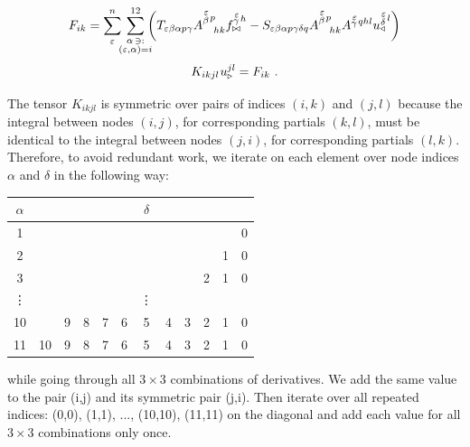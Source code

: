    \begin{equation}
      F_{ik} =
      \sum^n_\varepsilon
      \mkern-7mu
      \sum_{\substack{\alpha \, \ni: \\ (\varepsilon,\alpha) = i}}^{12}
      \mkern-10mu
      \qty(
      T_{\varepsilon \beta \alpha p \gamma}
      A^{\substack{\mkern2mu \varepsilon \\[0.15mm] \beta} \mkern2mu p}_{\mkern19mu hk}    f^{\substack{\mkern2mu \varepsilon \\[-0.4mm] \gamma} \mkern2mu h}_{\bowtie}
      -
      S_{\varepsilon \beta \alpha p \gamma \delta q}    A^{\substack{\mkern2mu \varepsilon \\[0.15mm] \beta} \mkern2mu p}_{\mkern19mu hk}    A^{\substack{\mkern2mu \varepsilon \\[-0.4mm] \gamma} \mkern2mu qhl}    u^{\substack{\mkern2mu \varepsilon \\[0.2mm] \delta} \mkern2mu l}_\triangleleft )
   \end{equation}
   \begin{equation*}
      K_{i k j l} \mkern1mu u^{j l}_\triangleright
      =
      F_{i k} \ .
   \end{equation*}

   The tensor $K_{ikjl}$ is symmetric over pairs of indices $(i,k)$ and $(j,l)$ because the integral between nodes $(i,j)$, for corresponding partials $(k,l)$, must be identical to the integral between nodes $(j,i)$, for corresponding partials $(l,k)$. Therefore, to avoid redundant work, we iterate on each element over node indices $\alpha$ and $\delta$ in the following way:

   \begin{longtable}{c|ccccccccccc}
      $\alpha$ & \hspace{6mm} & \hspace{6mm} & \hspace{6mm} & \hspace{6mm} & \hspace{6mm} & \hspace{1.3mm} $\delta$ \hspace{1.3mm} & \hspace{6mm} & \hspace{6mm} & \hspace{6mm} & \hspace{6mm} & \hspace{6mm} \\
      \hline
      1  &    &   &   &   &   &   &   &   &   &   & 0 \\
      2  &    &   &   &   &   &   &   &   &   & 1 & 0 \\
      3  &    &   &   &   &   &   &   &   & 2 & 1 & 0 \\
      \vdots&&  &   &   &   &\vdots&   &   &   &   &  \\
      10 &    & 9 & 8 & 7 & 6 & 5 & 4 & 3 & 2 & 1 & 0 \\
      11 & 10 & 9 & 8 & 7 & 6 & 5 & 4 & 3 & 2 & 1 & 0
   \end{longtable}
   
   while going through all $3 \times 3$ combinations of derivatives. We add the same value to the pair (i,j) and its symmetric pair (j,i). Then iterate over all repeated indices: (0,0), (1,1), ..., (10,10), (11,11) on the diagonal and add each value for all $3 \times 3$ combinations only once.

